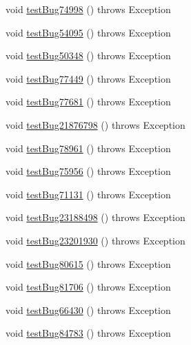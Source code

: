 \begin{DoxyCompactItemize}
\item 
void \mbox{\hyperlink{classtestsuite_1_1regression_1_1_statement_regression_test_a785d6999de84a7868d85817387113884}{test\+Bug74998}} ()  throws Exception 
\item 
void \mbox{\hyperlink{classtestsuite_1_1regression_1_1_statement_regression_test_a17a22ae1f0a93a72a1a4a4379cab692c}{test\+Bug54095}} ()  throws Exception 
\item 
void \mbox{\hyperlink{classtestsuite_1_1regression_1_1_statement_regression_test_a2b6b5d2943bee507e1d7495e883ae9c5}{test\+Bug50348}} ()  throws Exception 
\item 
void \mbox{\hyperlink{classtestsuite_1_1regression_1_1_statement_regression_test_a07a77723b5e6ea623ee8d6c78d7786af}{test\+Bug77449}} ()  throws Exception 
\item 
void \mbox{\hyperlink{classtestsuite_1_1regression_1_1_statement_regression_test_adc52d5ddc30d4e6b82fb24fd1c544d26}{test\+Bug77681}} ()  throws Exception 
\item 
void \mbox{\hyperlink{classtestsuite_1_1regression_1_1_statement_regression_test_a7c2127e901386b163bff95c5a884f307}{test\+Bug21876798}} ()  throws Exception 
\item 
void \mbox{\hyperlink{classtestsuite_1_1regression_1_1_statement_regression_test_a0813e2cf77078b1f8476ef827c5c9046}{test\+Bug78961}} ()  throws Exception 
\item 
void \mbox{\hyperlink{classtestsuite_1_1regression_1_1_statement_regression_test_ac552681461db44411308a9164a16e391}{test\+Bug75956}} ()  throws Exception 
\item 
void \mbox{\hyperlink{classtestsuite_1_1regression_1_1_statement_regression_test_a1e38b360b51a8f9704cef9040eb6a44d}{test\+Bug71131}} ()  throws Exception 
\item 
void \mbox{\hyperlink{classtestsuite_1_1regression_1_1_statement_regression_test_ad2c60d7105fb694d073cddbd8e1cdd48}{test\+Bug23188498}} ()  throws Exception 
\item 
void \mbox{\hyperlink{classtestsuite_1_1regression_1_1_statement_regression_test_a3d0ac2b92441d18279f454eff53dff23}{test\+Bug23201930}} ()  throws Exception 
\item 
void \mbox{\hyperlink{classtestsuite_1_1regression_1_1_statement_regression_test_a338c926f02a641b1cabb27021e7e06e4}{test\+Bug80615}} ()  throws Exception 
\item 
void \mbox{\hyperlink{classtestsuite_1_1regression_1_1_statement_regression_test_aa0b8a4caabb1d1ebc0338bcffacce81d}{test\+Bug81706}} ()  throws Exception 
\item 
void \mbox{\hyperlink{classtestsuite_1_1regression_1_1_statement_regression_test_ae6be3545c08d7afbbad86397d2ef9fb0}{test\+Bug66430}} ()  throws Exception 
\item 
void \mbox{\hyperlink{classtestsuite_1_1regression_1_1_statement_regression_test_a6a4bd5b7999d75792d30bdeb1b17b5af}{test\+Bug84783}} ()  throws Exception 
\end{DoxyCompactItemize}
